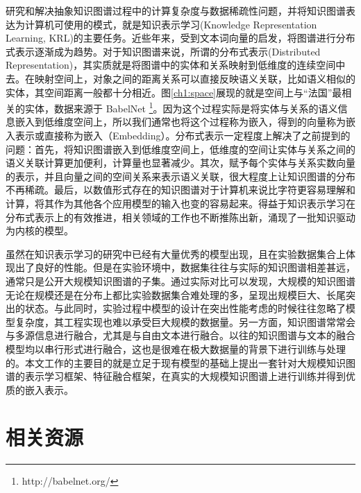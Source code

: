 研究和解决抽象知识图谱过程中的计算复杂度与数据稀疏性问题，并将知识图谱表达为计算机可使用的模式，就是知识表示学习(Knowledge Representation Learning, KRL)的主要任务。近些年来，受到文本词向量的启发，将图谱进行分布式表示逐渐成为趋势。对于知识图谱来说，所谓的分布式表示(Distributed Representation)，其实质就是将图谱中的实体和关系映射到低维度的连续空间中去。在映射空间上，对象之间的距离关系可以直接反映语义关联，比如语义相似的实体，其空间距离一般都十分相近。图\ref{ch1:space}展现的就是空间上与``法国''最相关的实体，数据来源于 BabelNet \footnote{http://babelnet.org/}。因为这个过程实际是将实体与关系的语义信息嵌入到低维度空间上，所以我们通常也将这个过程称为嵌入，得到的向量称为嵌入表示或直接称为嵌入（Embedding）。分布式表示一定程度上解决了之前提到的问题：首先，将知识图谱嵌入到低维度空间上，低维度的空间让实体与关系之间的语义关联计算更加便利，计算量也显著减少。其次，赋予每个实体与关系实数向量的表示，并且向量之间的空间关系来表示语义关联，很大程度上让知识图谱的分布不再稀疏。最后，以数值形式存在的知识图谱对于计算机来说比字符更容易理解和计算，将其作为其他各个应用模型的输入也变的容易起来。得益于知识表示学习在分布式表示上的有效推进，相关领域的工作也不断推陈出新，涌现了一批知识驱动为内核的模型。

虽然在知识表示学习的研究中已经有大量优秀的模型出现，且在实验数据集合上体现出了良好的性能。但是在实验环境中，数据集往往与实际的知识图谱相差甚远，通常只是公开大规模知识图谱的子集。通过实际对比可以发现，大规模的知识图谱无论在规模还是在分布上都比实验数据集合难处理的多，呈现出规模巨大、长尾突出的状态。与此同时，实验过程中模型的设计在突出性能考虑的时候往往忽略了模型复杂度，其工程实现也难以承受巨大规模的数据量。另一方面，知识图谱常常会与多源信息进行融合，尤其是与自由文本进行融合。以往的知识图谱与文本的融合模型均以串行形式进行融合，这也是很难在极大数据量的背景下进行训练与处理的。本文工作的主要目的就是立足于现有模型的基础上提出一套针对大规模知识图谱的表示学习框架、特征融合框架，在真实的大规模知识图谱上进行训练并得到优质的嵌入表示。

\section{相关资源}




